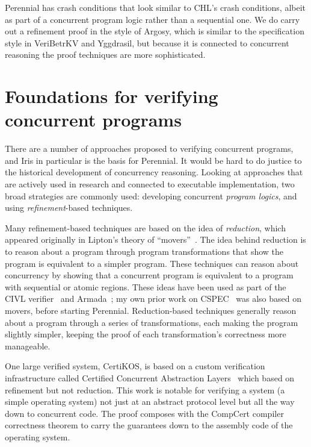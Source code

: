 Perennial has crash conditions that look similar to CHL's crash conditions,
albeit as part of a concurrent program logic rather than a sequential one. We do
carry out a refinement proof in the style of Argosy, which is similar to the
specification style in VeriBetrKV and Yggdrasil, but because it is connected to
concurrent reasoning the proof techniques are more sophisticated.

\section{Foundations for verifying concurrent programs}
\label{sec:rel:concurrency}

There are a number of approaches proposed to verifying concurrent programs, and
Iris in particular is the basis for Perennial. It
would be hard to do justice to the historical development of concurrency
reasoning. Looking at approaches that are actively used in research and
connected to executable implementation, two broad strategies are commonly used:
developing concurrent \emph{program logics}, and using \emph{refinement}-based
techniques.

Many refinement-based techniques are based on the idea of \emph{reduction},
which appeared originally in Lipton's theory of ``movers''~\cite{lipton:movers}.
The idea behind reduction is to reason about a program through program
transformations that show the program is equivalent to a simpler program. These
techniques can reason about concurrency by showing that a concurrent program is
equivalent to a program with sequential or atomic regions. These ideas have been
used as part of the CIVL verifier~\cite{hawblitzel:civl,kragl:civl-layers} and
Armada~\cite{lorch:armada}; my own prior work on CSPEC~\cite{chajed:cspec} was
also based on movers, before starting Perennial. Reduction-based techniques
generally reason about a program through a series of transformations, each
making the program slightly simpler, keeping the proof of each transformation's
correctness more manageable.

One large verified system, CertiKOS, is based on a custom verification
infrastructure called Certified Concurrent Abstraction
Layers~\cite{gu:certikos-ccal} which based on refinement but not reduction. This
work is notable for verifying a system (a simple operating system) not just at
an abstract protocol level but all the way down to concurrent code. The proof
composes with the CompCert compiler correctness theorem to carry the guarantees
down to the assembly code of the operating system.

